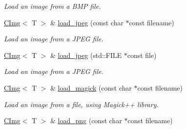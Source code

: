 \begin{DoxyCompactItemize}
\begin{DoxyCompactList}\small\item\em Load an image from a BMP file. \item\end{DoxyCompactList}\item 
\hypertarget{structcimg__library_1_1CImg_ae4e17798245c1eac132b4b286c8e4419}{
\hyperlink{structcimg__library_1_1CImg}{CImg}$<$ T $>$ \& \hyperlink{structcimg__library_1_1CImg_ae4e17798245c1eac132b4b286c8e4419}{load\_\-jpeg} (const char $\ast$const filename)}
\label{structcimg__library_1_1CImg_ae4e17798245c1eac132b4b286c8e4419}

\begin{DoxyCompactList}\small\item\em Load an image from a JPEG file. \item\end{DoxyCompactList}\item 
\hypertarget{structcimg__library_1_1CImg_ac07f0a5c16ae08ed62fd145b44b352cd}{
\hyperlink{structcimg__library_1_1CImg}{CImg}$<$ T $>$ \& \hyperlink{structcimg__library_1_1CImg_ac07f0a5c16ae08ed62fd145b44b352cd}{load\_\-jpeg} (std::FILE $\ast$const file)}
\label{structcimg__library_1_1CImg_ac07f0a5c16ae08ed62fd145b44b352cd}

\begin{DoxyCompactList}\small\item\em Load an image from a JPEG file. \item\end{DoxyCompactList}\item 
\hypertarget{structcimg__library_1_1CImg_a1b58020c04f6ddaa44007e9edbcba0a6}{
\hyperlink{structcimg__library_1_1CImg}{CImg}$<$ T $>$ \& \hyperlink{structcimg__library_1_1CImg_a1b58020c04f6ddaa44007e9edbcba0a6}{load\_\-magick} (const char $\ast$const filename)}
\label{structcimg__library_1_1CImg_a1b58020c04f6ddaa44007e9edbcba0a6}

\begin{DoxyCompactList}\small\item\em Load an image from a file, using Magick++ library. \item\end{DoxyCompactList}\item 
\hypertarget{structcimg__library_1_1CImg_a8d3058370782eb3e0ebc5c5213d86a27}{
\hyperlink{structcimg__library_1_1CImg}{CImg}$<$ T $>$ \& \hyperlink{structcimg__library_1_1CImg_a8d3058370782eb3e0ebc5c5213d86a27}{load\_\-png} (const char $\ast$const filename)}
\label{structcimg__library_1_1CImg_a8d3058370782eb3e0ebc5c5213d86a27}


\end{DoxyCompactItemize}
